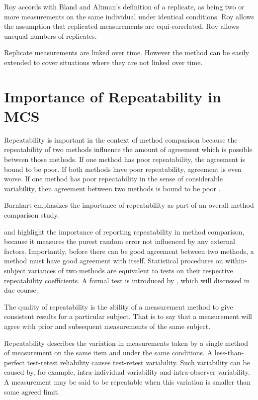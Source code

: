 \documentclass[12pt, a4paper]{report}
\theoremstyle{plain}
\theoremstyle{definition}
\theoremstyle{remark}
\begin{document}
	Roy accords with Bland and Altman's definition of a replicate, as being two or more measurements on the same individual under identical conditions. Roy allows the assumption that replicated measurements are equi-correlated. Roy allows unequal numbers of replicates.
	
	Replicate measurements are linked over time. However the method can be easily extended to cover situations where they are not linked over time.

	\section{Importance of Repeatability in MCS}
	
	Repeatability is important in the context of method comparison because the repeatability of two methods influence the amount of agreement which is possible between those methods. If one method has poor repeatability, the agreement is bound to be poor. If both methods have poor repeatability, agreement is even worse. If one method has poor repeatability in the sense of considerable variability, then agreement between two methods is bound to be poor \citep{ARoy2009}.
	
	
	Barnhart emphasizes the importance of repeatability as part of an overall method comparison study.
	
	\citet{Barnhart} and \citet{ARoy2009} highlight the importance of reporting repeatability in method comparison, because it measures the purest random error not influenced by any external factors. Importantly, before there can be good agreement between two methods, a method must have good agreement with itself.  Statistical procedures on within-subject variances of two methods are equivalent to tests on their respective repeatability coefficients. A formal test is introduced by \citet{ARoy2009}, which will discussed in due course.
	

	The quality of repeatability is the ability of a measurement method to give consistent results for a particular subject. That is to say that a measurement will agree with prior and subsequent measurements of the same subject.
	
	
	Repeatability describes the variation in measurements taken by a single method of measurement on the same item and under the same conditions. 
	A less-than-perfect test-retest reliability causes test-retest variability. Such variability can be caused by, for example, intra-individual variability and intra-observer variability. 
	A measurement may be said to be repeatable when this variation is smaller than some agreed limit.
	
\end{document}
